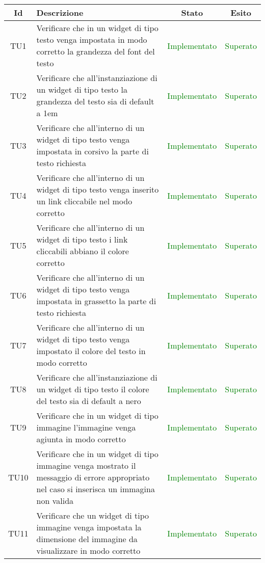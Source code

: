 \begin{center}
	\begin{longtable}{|c|>{\centering}m{10cm}|c|c|}\hline
		Id & Descrizione & Stato & Esito\\ \hline
		TU1 & Verificare che in un widget di tipo testo venga impostata in modo corretto la grandezza del font del testo & \textcolor{Green}{Implementato} & \textcolor{Green}{Superato} \\ \hline
		TU2 & Verificare che all'instanziazione di un widget di tipo testo la grandezza del testo sia di default a 1em & \textcolor{Green}{Implementato} & \textcolor{Green}{Superato} \\ \hline
		TU3 & Verificare che all'interno di un widget di tipo testo venga impostata in corsivo la parte di testo richiesta & \textcolor{Green}{Implementato} & \textcolor{Green}{Superato} \\ \hline
		TU4 & Verificare che all'interno di un widget di tipo testo venga inserito un link cliccabile nel modo corretto & \textcolor{Green}{Implementato} & \textcolor{Green}{Superato} \\ \hline
		TU5 & Verificare che all'interno di un widget di tipo testo i link cliccabili abbiano il colore corretto & \textcolor{Green}{Implementato} & \textcolor{Green}{Superato} \\ \hline
		TU6 & Verificare che all'interno di un widget di tipo testo venga impostata in grassetto la parte di testo richiesta & \textcolor{Green}{Implementato} & \textcolor{Green}{Superato} \\ \hline
		TU7 & Verificare che all'interno di un widget di tipo testo venga impostato il colore del testo in modo corretto & \textcolor{Green}{Implementato} & \textcolor{Green}{Superato} \\ \hline
		TU8 & Verificare che all'instanziazione di un widget di tipo testo il colore del testo sia di default a nero & \textcolor{Green}{Implementato} & \textcolor{Green}{Superato} \\ \hline
		TU9 & Verificare che in un widget di tipo immagine l'immagine venga agiunta in modo corretto & \textcolor{Green}{Implementato} & \textcolor{Green}{Superato} \\ \hline
		TU10 & Verificare che in un widget di tipo immagine venga mostrato il messaggio di errore appropriato nel caso si inserisca un immagina non valida & \textcolor{Green}{Implementato} & \textcolor{Green}{Superato} \\ \hline
		TU11 & Verificare che un widget di tipo immagine venga impostata la dimensione del immagine da visualizzare in modo corretto & \textcolor{Green}{Implementato} & \textcolor{Green}{Superato} \\ \hline

\end{longtable}
\end{center}
